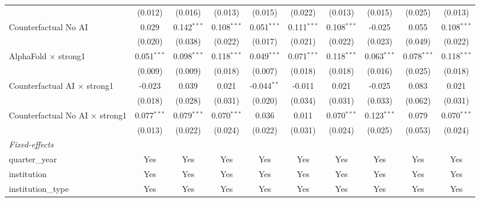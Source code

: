 \begin{tabular}{lccccccccc}
                                          & (0.012)       & (0.016)       & (0.013)       & (0.015)       & (0.022)       & (0.013)       & (0.015)       & (0.025)       & (0.013)\\   
   Counterfactual No AI                   & 0.029         & 0.142$^{***}$ & 0.108$^{***}$ & 0.051$^{***}$ & 0.111$^{***}$ & 0.108$^{***}$ & -0.025        & 0.055         & 0.108$^{***}$\\   
                                          & (0.020)       & (0.038)       & (0.022)       & (0.017)       & (0.021)       & (0.022)       & (0.023)       & (0.049)       & (0.022)\\   
   AlphaFold $\times$ strong1             & 0.051$^{***}$ & 0.098$^{***}$ & 0.118$^{***}$ & 0.049$^{***}$ & 0.071$^{***}$ & 0.118$^{***}$ & 0.063$^{***}$ & 0.078$^{***}$ & 0.118$^{***}$\\   
                                          & (0.009)       & (0.009)       & (0.018)       & (0.007)       & (0.018)       & (0.018)       & (0.016)       & (0.025)       & (0.018)\\   
   Counterfactual AI $\times$ strong1     & -0.023        & 0.039         & 0.021         & -0.044$^{**}$ & -0.011        & 0.021         & -0.025        & 0.083         & 0.021\\   
                                          & (0.018)       & (0.028)       & (0.031)       & (0.020)       & (0.034)       & (0.031)       & (0.033)       & (0.062)       & (0.031)\\   
   Counterfactual No AI $\times$ strong1  & 0.077$^{***}$ & 0.079$^{***}$ & 0.070$^{***}$ & 0.036         & 0.011         & 0.070$^{***}$ & 0.123$^{***}$ & 0.079         & 0.070$^{***}$\\   
                                          & (0.013)       & (0.022)       & (0.024)       & (0.022)       & (0.031)       & (0.024)       & (0.025)       & (0.053)       & (0.024)\\   
   \midrule
   \emph{Fixed-effects}\\
   quarter\_year                          & Yes           & Yes           & Yes           & Yes           & Yes           & Yes           & Yes           & Yes           & Yes\\  
   institution                            & Yes           & Yes           & Yes           & Yes           & Yes           & Yes           & Yes           & Yes           & Yes\\  
   institution\_type                      & Yes           & Yes           & Yes           & Yes           & Yes           & Yes           & Yes           & Yes           & Yes\\  

\end{tabular}
